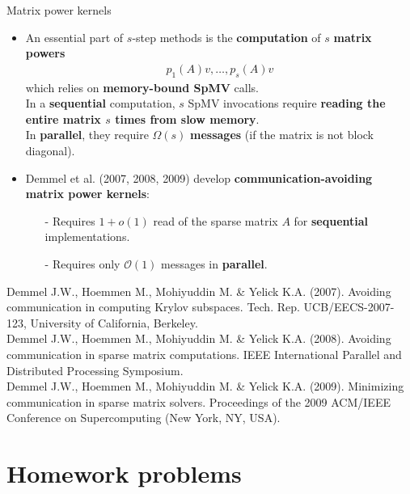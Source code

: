 \documentclass[t,usepdftitle=false]{beamer}
\begin{document}
\begin{frame}{Matrix power kernels}
\begin{itemize}
\item An essential part of $s$-step methods is the \textbf{computation} of $s$ \textbf{matrix powers}
\begin{align*}
p_{1}(A)v,\dots,p_s(A)v
\end{align*}
which relies on \textbf{memory-bound SpMV} calls.\vspace{.05cm}\\
In a \textbf{sequential} computation, $s$ SpMV invocations require \textbf{reading the entire matrix $s$ times from
slow memory}.\vspace{.05cm}\\
In \textbf{parallel}, they require $\Omega(s)$ \textbf{messages} (if the matrix is not block diagonal).
\item Demmel et al. (2007, 2008, 2009) develop \textbf{communication-avoiding matrix power kernels}:
\begin{itemize}\normalsize
\item[-] Requires $1+o(1)$ read of the sparse matrix $A$ for \textbf{sequential} implementations.\vspace{.05cm}
\item[-] Requires only $\mathcal{O}(1)$ messages in \textbf{parallel}. 
\end{itemize}
\end{itemize}
\smallskip
\tiny{Demmel J.W., Hoemmen M., Mohiyuddin M. \& Yelick K.A. (2007). Avoiding communication in computing Krylov subspaces. Tech. Rep. UCB/EECS-2007-123, University of California, Berkeley.}\tinyskip\\
\tiny{Demmel J.W., Hoemmen M., Mohiyuddin M. \& Yelick K.A. (2008). Avoiding communication in sparse matrix computations. IEEE International Parallel and Distributed Processing Symposium.}\tinyskip\\
\tiny{Demmel J.W., Hoemmen M., Mohiyuddin M. \& Yelick K.A. (2009). Minimizing communication in sparse matrix solvers. Proceedings of the 2009 ACM/IEEE Conference on Supercomputing (New York, NY, USA).}
\end{frame}

\section{Homework problems}
\end{document}
